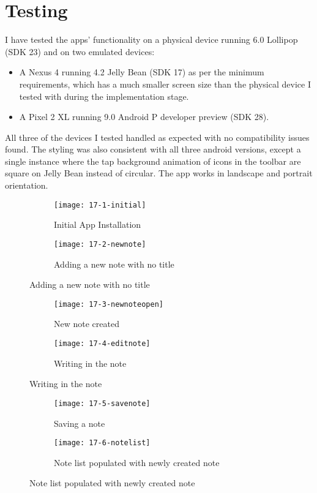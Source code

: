 \chapter{Testing}
\graphicspath{{4-testing/images/}}

I have tested the apps' functionality on a physical device running 6.0 Lollipop (SDK 23) and on two emulated devices:

\begin{itemize}
  \item A Nexus 4 running 4.2 Jelly Bean (SDK 17) as per the minimum requirements, which has a much smaller screen size than the physical device I tested with during the implementation stage.
  \item A Pixel 2 XL running 9.0 Android P developer preview (SDK 28).
\end{itemize}

All three of the devices I tested handled as expected with no compatibility issues found. The styling was also consistent with all three android versions, except a single instance where the tap background animation of icons in the toolbar are square on Jelly Bean instead of circular. The app works in landscape and portrait orientation.

\begin{figure}[H]
  \begin{subfigure}{.5\textwidth}
    \caption{Initial App Installation}
    \centering
    \texttt{[image: 17-1-initial]}
  \end{subfigure}
  \begin{subfigure}{.5\textwidth}
    \caption{Adding a new note with no title}
    \centering
    \texttt{[image: 17-2-newnote]}
  \end{subfigure}
\end{figure}

\begin{figure}[H]
  \begin{subfigure}{.5\textwidth}
    \caption{New note created}
    \centering
    \texttt{[image: 17-3-newnoteopen]}
  \end{subfigure}
  \begin{subfigure}{.5\textwidth}
    \caption{Writing in the note}
    \centering
    \texttt{[image: 17-4-editnote]}
  \end{subfigure}
\end{figure}

\begin{figure}[H]
  \begin{subfigure}{.5\textwidth}
    \caption{Saving a note}
    \centering
    \texttt{[image: 17-5-savenote]}
  \end{subfigure}
  \begin{subfigure}{.5\textwidth}
    \caption{Note list populated with newly created note}
    \centering
    \texttt{[image: 17-6-notelist]}
  \end{subfigure}
\end{figure}

